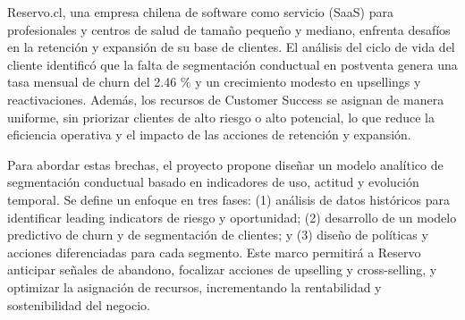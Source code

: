 \documentclass[
	spanish, %
	letterpaper, oneside
]{article}
\begin{document}
\templatePortrait

\templatePagecfg

\begin{abstractd}

Reservo.cl, una empresa chilena de software como servicio (SaaS) para profesionales y centros de salud de tamaño pequeño y mediano, enfrenta desafíos en la retención y expansión de su base de clientes. El análisis del ciclo de vida del cliente identificó que la falta de segmentación conductual en postventa genera una tasa mensual de churn del 2.46 \% y un crecimiento modesto en upsellings y reactivaciones. Además, los recursos de Customer Success se asignan de manera uniforme, sin priorizar clientes de alto riesgo o alto potencial, lo que reduce la eficiencia operativa y el impacto de las acciones de retención y expansión.

Para abordar estas brechas, el proyecto propone diseñar un modelo analítico de segmentación conductual basado en indicadores de uso, actitud y evolución temporal. Se define un enfoque en tres fases: (1) análisis de datos históricos para identificar leading indicators de riesgo y oportunidad; (2) desarrollo de un modelo predictivo de churn y de segmentación de clientes; y (3) diseño de políticas y acciones diferenciadas para cada segmento. Este marco permitirá a Reservo anticipar señales de abandono, focalizar acciones de upselling y cross-selling, y optimizar la asignación de recursos, incrementando la rentabilidad y sostenibilidad del negocio.

\end{abstractd}

\templateIndex

\templateFinalcfg



\end{document}
